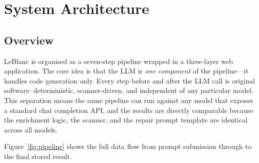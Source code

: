 \documentclass[12pt,a4paper]{report}
\begin{document}
\setcounter{page}{16}
\setcounter{chapter}{2}   %

\chapter{System Architecture}
\label{ch:system}

\section{Overview}
\label{sec:sysoverview}

LeBlanc is organised as a seven-step pipeline wrapped in a three-layer web
application. The core idea is that the LLM is \emph{one component} of the
pipeline---it handles code generation only. Every step before and after the
LLM call is original software: deterministic, scanner-driven, and independent
of any particular model. This separation means the same pipeline can run against
any model that exposes a standard chat completion API, and the results are
directly comparable because the enrichment logic, the scanner, and the repair
prompt template are identical across all models.

Figure~\ref{fig:pipeline} shows the full data flow from prompt submission through
to the final stored result.
\end{document}

